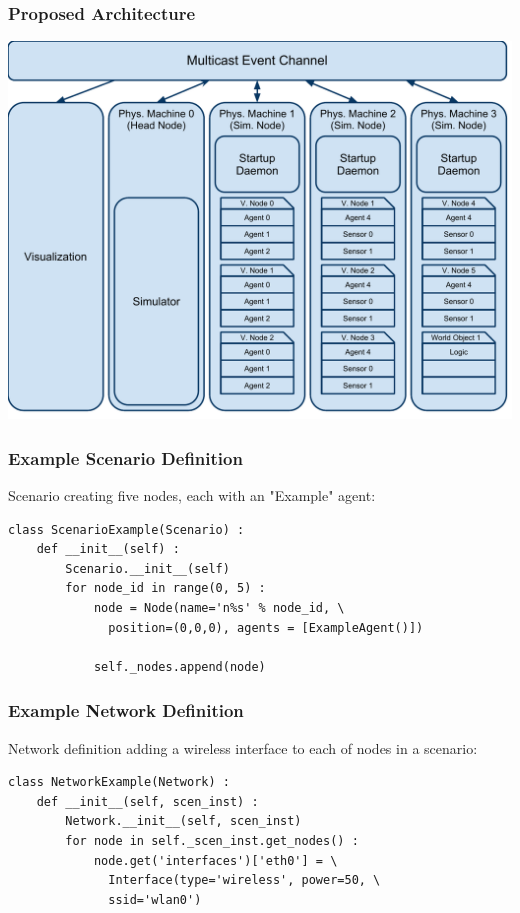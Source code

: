 \documentclass[mathserif]{beamer}
\begin{document}
\frame
{
    \frametitle{Proposed Architecture}
    \begin{center}
        \includegraphics{CTUSeminar.pdf}
    \end{center}
}

\begin{frame}[fragile]
    \frametitle{Example Scenario Definition}
    Scenario creating five nodes, each with an "Example" agent:
    \begin{verbatim}
class ScenarioExample(Scenario) :
    def __init__(self) :
        Scenario.__init__(self)
        for node_id in range(0, 5) :
            node = Node(name='n%s' % node_id, \
              position=(0,0,0), agents = [ExampleAgent()])
            
            self._nodes.append(node)
    \end{verbatim}
\end{frame}

\begin{frame}[fragile]
    \frametitle{Example Network Definition}
    Network definition adding a wireless interface to each of nodes in a scenario:
    \begin{verbatim}
class NetworkExample(Network) :
    def __init__(self, scen_inst) :
        Network.__init__(self, scen_inst)
        for node in self._scen_inst.get_nodes() :
            node.get('interfaces')['eth0'] = \
              Interface(type='wireless', power=50, \
              ssid='wlan0')
    \end{verbatim}
\end{frame}
\end{document}
